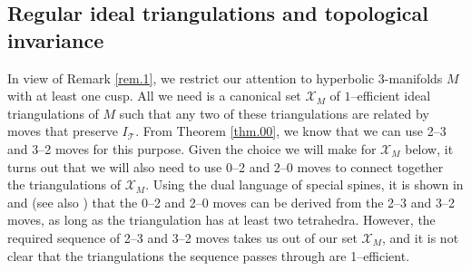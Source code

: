 \documentclass[12pt]{amsart}
\theoremstyle{definition}
\theoremstyle{remark}
\def\calX{\mathcal X}
\def\lbl{\label}
\newcommand{\CT}{\mathcal{T}}
\begin{document}
\subsection{Regular ideal triangulations and topological invariance}
\lbl{sub.regular}

In view of Remark \ref{rem.1}, we restrict our attention to 
hyperbolic 3-manifolds $M$ with at least one cusp. 
All we need is a canonical set 
$\calX_M$ of $1$--efficient ideal triangulations of $M$ such that any two of these 
triangulations are related by moves 
that preserve $I_{\CT}$. From Theorem \ref{thm.00}, we know that we can use 2--3 and 3--2 moves for this purpose. Given the choice we will make for $\calX_M$ below, it turns out that we will also need to use 0--2 and 2--0 moves to connect together the triangulations of $\calX_M$. 
Using the dual language of special spines, it is shown in 
\cite[Lem.2.1.11]{Ma2} and \cite{Pi}
(see also \cite[Prop.I.1.13]{Petronio:thesis})
that the 0--2 and 2--0 moves can be derived from the 2--3 and 3--2 moves, as long as the triangulation has at least two tetrahedra. However, the required sequence of 2--3 and 3--2 moves takes us out of our set $\calX_M$, and it is not clear that the triangulations the sequence passes through are 1--efficient.
\end{document}

